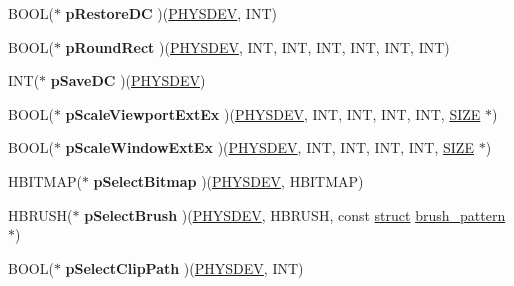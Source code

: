 \begin{DoxyCompactItemize}
B\+O\+OL($\ast$ {\bfseries p\+Restore\+DC} )(\hyperlink{structgdi__physdev}{P\+H\+Y\+S\+D\+EV}, I\+NT)
\item 
\mbox{\label{structgdi__dc__funcs_a06b86217e83751138637aff5cfc87c04}} 
B\+O\+OL($\ast$ {\bfseries p\+Round\+Rect} )(\hyperlink{structgdi__physdev}{P\+H\+Y\+S\+D\+EV}, I\+NT, I\+NT, I\+NT, I\+NT, I\+NT, I\+NT)
\item 
\mbox{\label{structgdi__dc__funcs_a087b8644394c77cb4eb993bd20f7a7d2}} 
I\+NT($\ast$ {\bfseries p\+Save\+DC} )(\hyperlink{structgdi__physdev}{P\+H\+Y\+S\+D\+EV})
\item 
\mbox{\label{structgdi__dc__funcs_affccaf4f74b9755380ebb5c1c14cabb2}} 
B\+O\+OL($\ast$ {\bfseries p\+Scale\+Viewport\+Ext\+Ex} )(\hyperlink{structgdi__physdev}{P\+H\+Y\+S\+D\+EV}, I\+NT, I\+NT, I\+NT, I\+NT, \hyperlink{structtag_s_i_z_e}{S\+I\+ZE} $\ast$)
\item 
\mbox{\label{structgdi__dc__funcs_a42d409dcaf7cf27021c320065af5f9b2}} 
B\+O\+OL($\ast$ {\bfseries p\+Scale\+Window\+Ext\+Ex} )(\hyperlink{structgdi__physdev}{P\+H\+Y\+S\+D\+EV}, I\+NT, I\+NT, I\+NT, I\+NT, \hyperlink{structtag_s_i_z_e}{S\+I\+ZE} $\ast$)
\item 
\mbox{\label{structgdi__dc__funcs_aff34e6be2bbc47ef98d8317f833297e6}} 
H\+B\+I\+T\+M\+AP($\ast$ {\bfseries p\+Select\+Bitmap} )(\hyperlink{structgdi__physdev}{P\+H\+Y\+S\+D\+EV}, H\+B\+I\+T\+M\+AP)
\item 
\mbox{\label{structgdi__dc__funcs_aad7e95a3f3312556c72fccc5cbc1c3c4}} 
H\+B\+R\+U\+SH($\ast$ {\bfseries p\+Select\+Brush} )(\hyperlink{structgdi__physdev}{P\+H\+Y\+S\+D\+EV}, H\+B\+R\+U\+SH, const \hyperlink{interfacestruct}{struct} \hyperlink{structbrush__pattern}{brush\+\_\+pattern} $\ast$)
\item 
\mbox{\label{structgdi__dc__funcs_a72baad8a5ebb19f63e0e1e4c63e4dcc9}} 
B\+O\+OL($\ast$ {\bfseries p\+Select\+Clip\+Path} )(\hyperlink{structgdi__physdev}{P\+H\+Y\+S\+D\+EV}, I\+NT)
\item 
\mbox{\label{structgdi__dc__funcs_a18390ab353bed4f4fb517d3397147522}} 

\end{DoxyCompactItemize}
